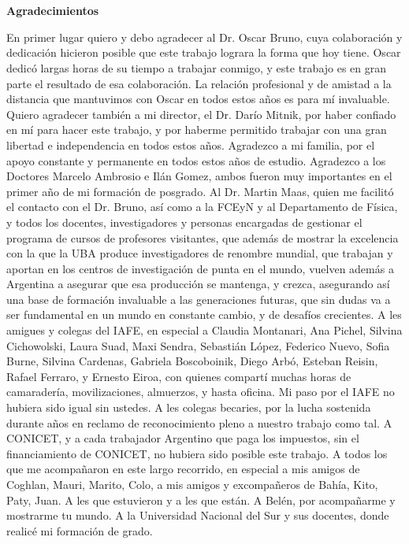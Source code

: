 \pagestyle{empty}
\chapter*{}

\begin{center}
\begin{large}
\textbf{Agradecimientos}
\end{large}
\end{center}

\vspace{1cm}
En primer lugar quiero y debo agradecer al Dr. Oscar Bruno, cuya 
colaboración y dedicación hicieron posible que 
este trabajo lograra la forma que hoy tiene. Oscar dedicó largas 
horas de su tiempo a trabajar conmigo, 
y este trabajo es en gran parte el resultado de esa colaboración. 
La relación profesional y de amistad a la distancia que mantuvimos 
con Oscar en todos estos años es para mí invaluable. 
Quiero agradecer también a mi director, el Dr. Darío Mitnik, por 
haber confiado en mí para hacer este trabajo, y por haberme permitido 
trabajar con una gran libertad e independencia en todos estos años. 
Agradezco a mi familia, por el apoyo constante y permanente 
en todos estos años de estudio. 
Agradezco a los Doctores Marcelo Ambrosio e Ilán Gomez, 
ambos fueron muy importantes en el primer año de mi formación de posgrado. 
Al Dr. Martin Maas, quien me facilitó el contacto con el Dr. Bruno, 
así como a la FCEyN y al Departamento de Física, y todos los docentes, 
investigadores y personas encargadas de gestionar el programa de cursos de profesores visitantes, 
que además de mostrar la excelencia con la que la UBA produce investigadores 
de renombre mundial, que trabajan y aportan 
en los centros de investigación de punta en el mundo, vuelven además a Argentina 
a asegurar que esa producción se mantenga, 
y crezca, asegurando así una base de formación invaluable 
a las generaciones futuras, que sin dudas va a ser fundamental 
en un mundo en constante cambio, y de desafíos crecientes. 
 A les amigues y colegas del IAFE, en especial a 
Claudia Montanari, Ana Pichel, Silvina Cichowolski, Laura Suad, Maxi Sendra, Sebastián López, 
Federico Nuevo, Sofia Burne, Silvina Cardenas, Gabriela Boscoboinik, Diego Arbó, Esteban Reisin, Rafael Ferraro,  y Ernesto Eiroa, con quienes 
compartí muchas horas de camaradería, movilizaciones, almuerzos, y hasta oficina. 
Mi paso por el IAFE no hubiera sido igual sin ustedes. 
A les colegas becaries, por la lucha sostenida durante años en reclamo de 
reconocimiento pleno a nuestro trabajo como tal. 
A CONICET, y a cada trabajador Argentino que paga los impuestos, 
sin el financiamiento de CONICET, no hubiera sido posible este trabajo. 
A todos los que me acompañaron en este largo recorrido, 
en especial a mis amigos de Coghlan, Mauri, Marito, Colo, a mis amigos y 
excompañeros de Bahía, Kito, Paty, Juan. A les que estuvieron y a les que están. A Belén, 
por acompañarme y mostrarme tu mundo. A la Universidad Nacional del Sur y sus 
docentes, donde realicé mi formación de grado.

